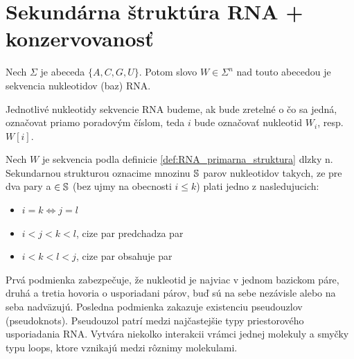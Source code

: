 \section{Sekundárna štruktúra RNA + konzervovanosť}

\begin{definice}
  \label{def:RNA_primarna_struktura}
  Nech $\Sigma$ je abeceda $\{A, C, G, U\}$. Potom slovo $W \in \Sigma^n$ nad touto abecedou
  je sekvencia nukleotidov (baz) RNA.
\end{definice}

Jednotlivé nukleotidy sekvencie RNA budeme, ak bude zretelné o čo sa jedná, označovat priamo poradovým 
číslom, teda $i$ bude označovať nukleotid $W_{i}$, resp. $W[i]$.

\begin{definice}
  \label{def:RNA_sekundarna_struktura}
  Nech $W$ je sekvencia podla definicie \ref{def:RNA_primarna_struktura} dlzky n.
  Sekundarnou strukturou oznacime mnozinu $\mathbb{S}$ parov nukleotidov  takych, ze
  pre dva pary  a  $\in \mathbb{S}$ (bez ujmy na obecnosti $i \leq k$)
  plati jedno z nasledujucich:
  \begin{itemize}
    \item $i = k \iff j = l$
    \item $i < j < k < l$, cize par  predchadza par 
    \item $i < k < l < j$, cize par  obsahuje par 
  \end{itemize}
\end{definice}


Prvá podmienka zabezpečuje, že nukleotid je najviac v jednom bazickom páre, druhá a tretia
hovoria o usporiadani párov, buď sú na sebe nezávisle alebo na seba nadväzujú.
Posledna podmienka zakazuje existenciu pseudouzlov (pseudoknots). Pseudouzol patrí medzi najčastejšie typy priestorového usporiadania RNA. Vytvára  niekolko interakcii vrámci jednej molekuly a smyčky typu loops,  ktore vznikajú medzi rôznimy molekulami.


